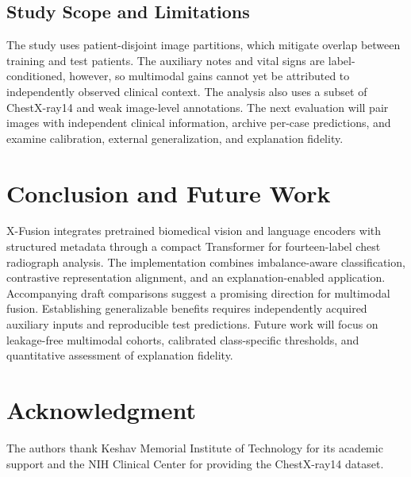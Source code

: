\documentclass[conference,letterpaper]{IEEEtran}
\begin{document}
\subsection{Study Scope and Limitations}

The study uses patient-disjoint image partitions, which mitigate overlap between training and test patients. The auxiliary notes and vital signs are label-conditioned, however, so multimodal gains cannot yet be attributed to independently observed clinical context. The analysis also uses a subset of ChestX-ray14 and weak image-level annotations. The next evaluation will pair images with independent clinical information, archive per-case predictions, and examine calibration, external generalization, and explanation fidelity.

\section{Conclusion and Future Work}

X-Fusion integrates pretrained biomedical vision and language encoders with structured metadata through a compact Transformer for fourteen-label chest radiograph analysis. The implementation combines imbalance-aware classification, contrastive representation alignment, and an explanation-enabled application. Accompanying draft comparisons suggest a promising direction for multimodal fusion. Establishing generalizable benefits requires independently acquired auxiliary inputs and reproducible test predictions. Future work will focus on leakage-free multimodal cohorts, calibrated class-specific thresholds, and quantitative assessment of explanation fidelity.

\section*{Acknowledgment}

The authors thank Keshav Memorial Institute of Technology for its academic support and the NIH Clinical Center for providing the ChestX-ray14 dataset.
\end{document}
